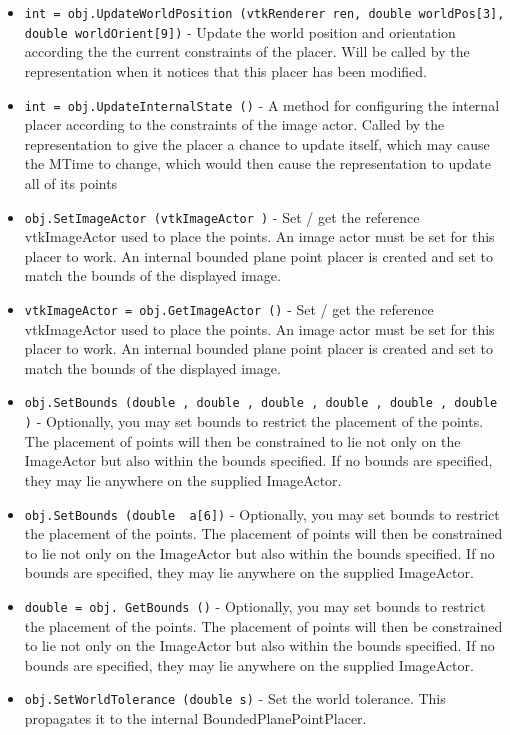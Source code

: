 \begin{itemize}
\item  \verb|int = obj.UpdateWorldPosition (vtkRenderer ren, double worldPos[3], double worldOrient[9])| -  Update the world position and orientation according the
 the current constraints of the placer. Will be called
 by the representation when it notices that this placer
 has been modified.

\item  \verb|int = obj.UpdateInternalState ()| -  A method for configuring the internal placer according
 to the constraints of the image actor.
 Called by the representation to give the placer a chance
 to update itself, which may cause the MTime to change,
 which would then cause the representation to update
 all of its points

\item  \verb|obj.SetImageActor (vtkImageActor )| -  Set / get the reference vtkImageActor used to place the points.
 An image actor must be set for this placer to work. An internal
 bounded plane point placer is created and set to match the bounds
 of the displayed image.

\item  \verb|vtkImageActor = obj.GetImageActor ()| -  Set / get the reference vtkImageActor used to place the points.
 An image actor must be set for this placer to work. An internal
 bounded plane point placer is created and set to match the bounds
 of the displayed image.

\item  \verb|obj.SetBounds (double , double , double , double , double , double )| -  Optionally, you may set bounds to restrict the placement of the points.
 The placement of points will then be constrained to lie not only on
 the ImageActor but also within the bounds specified. If no bounds are
 specified, they may lie anywhere on the supplied ImageActor.

\item  \verb|obj.SetBounds (double  a[6])| -  Optionally, you may set bounds to restrict the placement of the points.
 The placement of points will then be constrained to lie not only on
 the ImageActor but also within the bounds specified. If no bounds are
 specified, they may lie anywhere on the supplied ImageActor.

\item  \verb|double = obj. GetBounds ()| -  Optionally, you may set bounds to restrict the placement of the points.
 The placement of points will then be constrained to lie not only on
 the ImageActor but also within the bounds specified. If no bounds are
 specified, they may lie anywhere on the supplied ImageActor.

\item  \verb|obj.SetWorldTolerance (double s)| -  Set the world tolerance. This propagates it to the internal 
 BoundedPlanePointPlacer.

\end{itemize}
